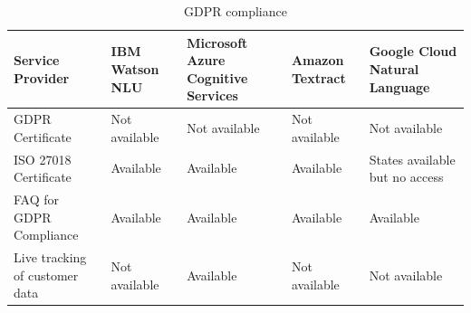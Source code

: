 \begin{table}[h]
\caption{GDPR compliance} 
\begin{center}
   
  \begin{tabular}{| p{2.8cm} || p{2.7cm} | p{3.5cm} | p{2.1cm} | p{2.9cm} |}
   
\hline
 \textbf{Service Provider} & \textbf{\acs{IBM} Watson \acs{NLU}} & \textbf{Microsoft Azure Cognitive \hspace{1cm} Services} & \textbf{Amazon Textract} & \textbf{Google Cloud Natural \hspace{1.5cm} Language}\\ \hline \hline 
 
     \acs{GDPR} \hspace{1.3cm} Certificate & Not available & Not available & Not \hspace{1.5cm} available & Not available\\ \hline
     ISO 27018 \hspace{1.3cm} Certificate & Available & Available & Available & States available but no access\\ \hline
     \acs{FAQ} for \acs{GDPR} \hspace{1.3cm} Compliance & Available & Available & Available & Available\\ \hline
     Live tracking of customer data & Not available & Available & Not \hspace{1.5cm} available  & Not available\\ \hline 
     
\end{tabular}                          
\end{center}
\end{table}

